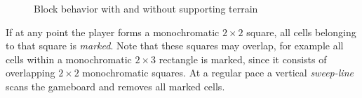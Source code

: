 \begin{figure}[H]
    \centering
    \caption{Block behavior with and without supporting terrain}
\end{figure}

If at any point the player forms a monochromatic $2 \times 2$ square, all cells belonging to that square is \textit{marked}. Note that these squares may overlap, for example all cells within a monochromatic $2 \times 3$ rectangle is marked, since it consists of overlapping $2 \times 2$ monochromatic squares. At a regular pace a vertical \textit{sweep-line} scans the gameboard and removes all marked cells.

